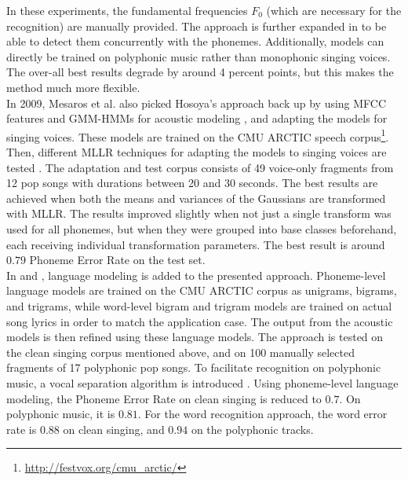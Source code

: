 In these experiments, the fundamental frequencies $F_0$ (which are necessary for the recognition) are manually provided. The approach is further expanded in \cite{concurrent_f0_phonemes} to be able to detect them concurrently with the phonemes. Additionally, models can directly be trained on polyphonic music rather than monophonic singing voices. The over-all best results degrade by around 4 percent points, but this makes the method much more flexible.\\

In 2009, Mesaros et al. also picked Hosoya's approach back up by using MFCC features and GMM-HMMs for acoustic modeling \cite{Mesaros2009}, and adapting the models for singing voices. These models are trained on the CMU ARCTIC speech corpus\footnote{\url{http://festvox.org/cmu_arctic/}}. Then, different MLLR techniques for adapting the models to singing voices are tested \cite{mllr}.
The adaptation and test corpus consists of 49 voice-only fragments from 12 pop songs with durations between 20 and 30 seconds. The best results are achieved when both the means and variances of the Gaussians are transformed with MLLR. The results improved slightly when not just a single transform was used for all phonemes, but when they were grouped into base classes beforehand, each receiving individual transformation parameters. The best result is around $0.79$ Phoneme Error Rate on the test set.\\

In \cite{Mesaros2010} and \cite{Mesaros2011}, language modeling is added to the presented approach. Phoneme-level language models are trained on the CMU ARCTIC corpus as unigrams, bigrams, and trigrams, while word-level bigram and trigram models are trained on actual song lyrics in order to match the application case. The output from the acoustic models is then refined using these language models. The approach is tested on the clean singing corpus mentioned above, and on 100 manually selected fragments of 17 polyphonic pop songs. To facilitate recognition on polyphonic music, a vocal separation algorithm is introduced \cite{virtanen_separation}.
Using phoneme-level language modeling, the Phoneme Error Rate on clean singing is reduced to $0.7$. On polyphonic music, it is $0.81$. For the word recognition approach, the word error rate is $0.88$ on clean singing, and $0.94$ on the polyphonic tracks.\\

